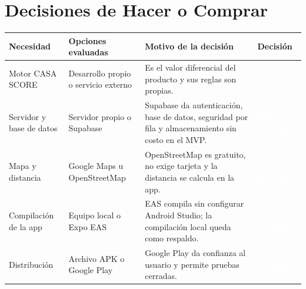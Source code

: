 \documentclass[11pt,a4paper]{article}
\newcommand{\etiqueta}[2]{{\setlength{\fboxsep}{2pt}\colorbox{#1}{\textcolor{white}{\scriptsize\bfseries #2}}}}
\begin{document}
\section{Decisiones de Hacer o Comprar}
{\small
{}
\noindent\begin{tabularx}{\textwidth}{@{}P{2.7cm} P{3.0cm} L P{2.4cm}@{}}
\toprule
{}
\textbf{Necesidad} & \textbf{Opciones evaluadas} & \textbf{Motivo de la decisión} & \textbf{Decisión} \\
\midrule
Motor CASA SCORE & Desarrollo propio o servicio externo & Es el valor diferencial del producto y sus reglas son propias. & \etiqueta{Rama4}{Hacer} \\
Servidor y base de datos & Servidor propio o Supabase & Supabase da autenticación, base de datos, seguridad por fila y almacenamiento sin costo en el MVP. & \etiqueta{Rama2}{Usar servicio} \\
Mapa y distancia & Google Maps u OpenStreetMap & OpenStreetMap es gratuito, no exige tarjeta y la distancia se calcula en la app. & \etiqueta{Rama2}{Usar servicio} \\
Compilación de la app & Equipo local o Expo EAS & EAS compila sin configurar Android Studio; la compilación local queda como respaldo. & \etiqueta{Rama2}{Usar servicio} \\
Distribución & Archivo APK o Google Play & Google Play da confianza al usuario y permite pruebas cerradas. & \etiqueta{SevMedia}{Comprar} \\
\bottomrule
\end{tabularx}
}

\end{document}

